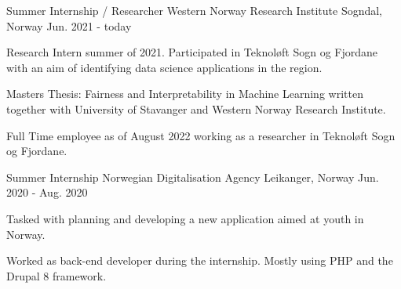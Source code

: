 

\begin{cventries}

\cventry
    {Summer Internship / Researcher} %
    {Western Norway Research Institute} %
    {Sogndal, Norway} %
    {Jun. 2021 - today} %
    {
      \begin{cvitems} %
        \item {Research Intern summer of 2021. Participated in Teknoløft Sogn og Fjordane with an aim of identifying data science applications in the region.}
        \item {Masters Thesis: Fairness and Interpretability in Machine Learning written together with University of Stavanger and Western Norway Research Institute.}
        \item {Full Time employee as of August 2022 working as a researcher in Teknoløft Sogn og Fjordane.}
      \end{cvitems}
    }


  \cventry
    {Summer Internship} %
    {Norwegian Digitalisation Agency} %
    {Leikanger, Norway} %
    {Jun. 2020 - Aug. 2020} %
    {
      \begin{cvitems} %
        \item {Tasked with planning and developing a new application aimed at youth in Norway.}
        \item {Worked as back-end developer during the internship. Mostly using PHP and the Drupal 8 framework.}
      \end{cvitems}
    }


\end{cventries}
